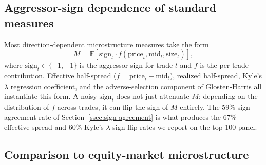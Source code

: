 \documentclass[11pt,a4paper,twocolumn]{article}
\begin{document}
\subsection{Aggressor-sign dependence of standard measures}

Most direction-dependent microstructure measures take the form
\begin{equation*}
  M = \mathbb{E}\!\left[
    \mathrm{sign}_t \cdot
    f(\mathrm{price}_t, \mathrm{mid}_t, \mathrm{size}_t)
  \right],
\end{equation*}
where $\mathrm{sign}_t \in \{-1, +1\}$ is the aggressor sign for
trade $t$ and $f$ is the per-trade contribution. Effective half-spread
($f = \mathrm{price}_t - \mathrm{mid}_t$), realized half-spread,
Kyle's $\lambda$ regression coefficient, and the adverse-selection
component of Glosten-Harris all instantiate this form. A noisy $\mathrm{sign}_t$ does not just attenuate $M$; depending on
the distribution of $f$ across trades, it can flip the sign of $M$
entirely. The 59\% sign-agreement rate of
Section~\ref{ssec:sign-agreement} is what produces the 67\%
effective-spread and 60\% Kyle's $\lambda$ sign-flip rates we report
on the top-100 panel.

\subsection{Comparison to equity-market microstructure}\label{ssec:equity-comparison}
\end{document}
